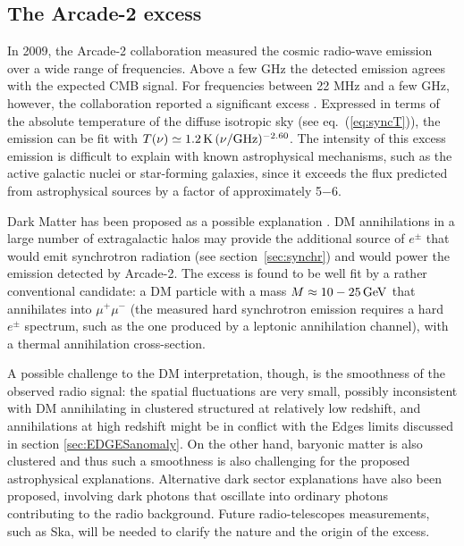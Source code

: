 \subsection{The {\sc Arcade-2} excess}\label{sec:ARCADEexcess}
In 2009, the {\sc Arcade-2} collaboration measured the cosmic radio-wave emission over a wide range of frequencies. 
Above a few GHz the detected emission agrees  with the expected CMB signal. 
For frequencies between 22 MHz and a few GHz, however, the collaboration reported a significant excess \cite{ARCADE2}. 
Expressed in terms of the absolute temperature of the diffuse isotropic sky (see eq.~(\ref{eq:syncT})), the emission can be fit with $T(\nu) \simeq 1.2 \, {\rm K} \, (\nu/{\rm GHz})^{-2.60}$. 
The intensity of this excess emission is difficult to explain with known astrophysical mechanisms, such as the active galactic nuclei or star-forming galaxies, since it exceeds the flux predicted from astrophysical sources by a factor of approximately 5$-$6.
\medskip
 
Dark Matter has been proposed as a possible explanation \cite{ARCADE2}. 
DM annihilations in a large number of extragalactic halos may provide the additional source of $e^\pm$ 
that would emit synchrotron radiation (see section~\ref{sec:synchr}) and would power the emission detected by  {\sc Arcade-2}. 
The excess is found to be well fit by a rather conventional candidate: a DM particle with a mass $M \approx10 - 25\,{\rm GeV}$  
that annihilates into $\mu^+\mu^-$ (the measured hard synchrotron emission requires a hard $e^\pm$ spectrum, such as the one produced by a leptonic annihilation channel), with a thermal annihilation cross-section. 

A possible challenge to the DM interpretation, though, is the smoothness of the observed radio signal: the spatial fluctuations are very small, possibly inconsistent with DM annihilating in clustered structured at relatively low redshift, and annihilations at high redshift might be in conflict with the {\sc Edges} limits discussed in section \ref{sec:EDGESanomaly}. On the other hand, baryonic matter is also clustered and thus such a smoothness is also challenging for the proposed astrophysical explanations. 
 Alternative dark sector explanations have also been proposed, involving dark photons that oscillate into ordinary photons contributing to the radio background. Future radio-telescopes measurements, such as {\sc Ska}, will be needed to clarify the nature and the origin of the excess.


